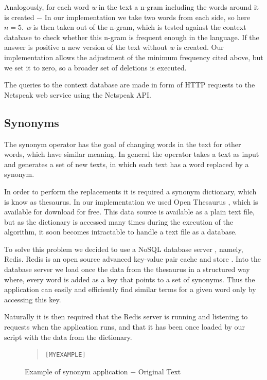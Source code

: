 \documentclass{reportAlternative}
\begin{document}
Analogously, for each word \emph{w} in the text a n-gram including the words around it is created $-$ In our implementation we take two words from each side, so here $n=5$. \emph{w} is then taken out of the n-gram, which is tested against the context database to check whether this n-gram is frequent enough in the language. If the answer is positive a new version of the text without \emph{w} is created. Our implementation allows the adjustment of the minimum frequency cited above, but we set it to zero, so a broader set of deletions is executed. \par

The queries to the context database are made in form of HTTP requests to the Netspeak web service using the Netspeak API. \par

\subsection{Synonyms}
The synonym operator has the goal of changing words in the text for other words, which have similar meaning. In general the operator takes a text as input and generates a set of new texts, in which each text has a word replaced by a synonym.

In order to perform the replacements it is required a synonym dictionary, which is know as thesaurus. In our implementation we used Open Thesaurus \cite{OpenThesuarus}, which is available for download for free. This data source is available as a plain text file, but as the dictionary is accessed many times during the execution of the algorithm, it soon becomes intractable to handle a text file as a database.

To solve this problem we decided to use a NoSQL database server \cite{NoSQL}, namely, Redis. Redis is an open source advanced key-value pair cache and store \cite{Redis}. Into the database server we load once the data from the thesaurus in a structured way where, every word is added as a key that points to a set of synonyms. Thus the application can easily and efficiently find similar terms for a given word only by accessing this key.

Naturally it is then required that the Redis server is running and listening to requests when the application runs, and that it has been once loaded by our script with the data from the dictionary.

\begin{figure}[H]
\begin{quote}
\begin{alltt}
[MY EXAMPLE]
\end{alltt}
\end{quote}
\caption{Example of synonym application $-$ Original Text}
\end{figure}
\end{document}
